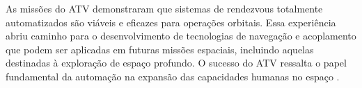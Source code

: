 As missões do ATV demonstraram que sistemas de rendezvous totalmente automatizados são viáveis e eficazes para operações orbitais. Essa experiência abriu caminho para o desenvolvimento de tecnologias de navegação e acoplamento que podem ser aplicadas em futuras missões espaciais, incluindo aquelas destinadas à exploração de espaço profundo. O sucesso do ATV ressalta o papel fundamental da automação na expansão das capacidades humanas no espaço \citep{esaATVRendezvous}.















